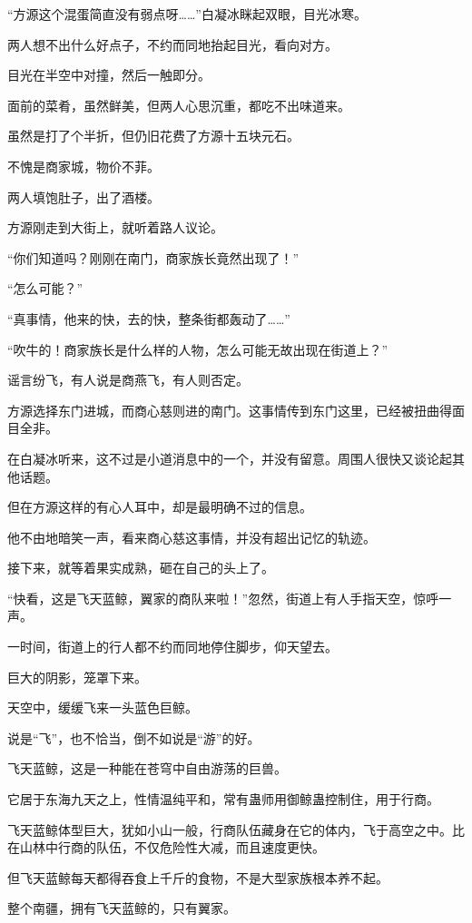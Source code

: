 \begin{this_body}
“方源这个混蛋简直没有弱点呀……”白凝冰眯起双眼，目光冰寒。

两人想不出什么好点子，不约而同地抬起目光，看向对方。

目光在半空中对撞，然后一触即分。

面前的菜肴，虽然鲜美，但两人心思沉重，都吃不出味道来。

虽然是打了个半折，但仍旧花费了方源十五块元石。

不愧是商家城，物价不菲。

两人填饱肚子，出了酒楼。

方源刚走到大街上，就听着路人议论。

“你们知道吗？刚刚在南门，商家族长竟然出现了！”

“怎么可能？”

“真事情，他来的快，去的快，整条街都轰动了……”

“吹牛的！商家族长是什么样的人物，怎么可能无故出现在街道上？”

谣言纷飞，有人说是商燕飞，有人则否定。

方源选择东门进城，而商心慈则进的南门。这事情传到东门这里，已经被扭曲得面目全非。

在白凝冰听来，这不过是小道消息中的一个，并没有留意。周围人很快又谈论起其他话题。

但在方源这样的有心人耳中，却是最明确不过的信息。

他不由地暗笑一声，看来商心慈这事情，并没有超出记忆的轨迹。

接下来，就等着果实成熟，砸在自己的头上了。

“快看，这是飞天蓝鲸，翼家的商队来啦！”忽然，街道上有人手指天空，惊呼一声。

一时间，街道上的行人都不约而同地停住脚步，仰天望去。

巨大的阴影，笼罩下来。

天空中，缓缓飞来一头蓝色巨鲸。

说是“飞”，也不恰当，倒不如说是“游”的好。

飞天蓝鲸，这是一种能在苍穹中自由游荡的巨兽。

它居于东海九天之上，性情温纯平和，常有蛊师用御鲸蛊控制住，用于行商。

飞天蓝鲸体型巨大，犹如小山一般，行商队伍藏身在它的体内，飞于高空之中。比在山林中行商的队伍，不仅危险性大减，而且速度更快。

但飞天蓝鲸每天都得吞食上千斤的食物，不是大型家族根本养不起。

整个南疆，拥有飞天蓝鲸的，只有翼家。


\end{this_body}
